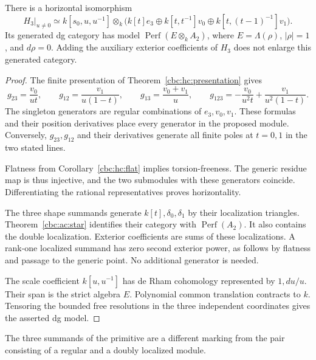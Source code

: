 \begin{proposition}\label{cbc:ac:primitive-chart}
There is a horizontal isomorphism
\[
 H_3|_{u\ne0}\simeq k[s_0,u,u^{-1}]\otimes_k
 \bigl(k[t]e_3\oplus k[t,t^{-1}]v_0
                   \oplus k[t,(t-1)^{-1}]v_1\bigr).
\]
Its generated dg category has model
$\operatorname{Perf}(E\otimes_k A_2)$, where
$E=\Lambda(\rho)$, $|\rho|=1$, and $d\rho=0$.
Adding the auxiliary exterior coefficients of $H_3$
does not enlarge this generated category.
\end{proposition}
\begin{proof}
The finite presentation of
Theorem~\ref{cbc:hc:presentation} gives
\[
 g_{23}=\frac{v_0}{ut},\qquad
 g_{12}=\frac{v_1}{u(1-t)},\qquad
 g_{13}=\frac{v_0+v_1}{u},\qquad
 g_{123}=-\frac{v_0}{u^2t}+\frac{v_1}{u^2(1-t)}.
\]
The singleton generators are regular combinations of
$e_3,v_0,v_1$. These formulas and their position
derivatives place every generator in the proposed
module. Conversely, $g_{23},g_{12}$ and their
derivatives generate all finite poles at $t=0,1$
in the two stated lines.

Flatness from
Corollary~\ref{cbc:hc:flat} implies torsion-freeness.
The generic residue map is thus injective, and the
two submodules with these generators coincide.
Differentiating the rational representatives proves
horizontality.

The three shape summands generate $k[t],\delta_0,\delta_1$
by their localization triangles. Theorem~\ref{cbc:ac:star}
identifies their category with $\operatorname{Perf}(A_2)$.
It also contains the double localization. Exterior
coefficients are sums of these localizations. A rank-one
localized summand has zero second exterior power,
as follows by flatness and passage to the generic point.
No additional generator is needed.

The scale coefficient $k[u,u^{-1}]$ has de Rham
cohomology represented by $1,du/u$. Their span is
the strict algebra $E$. Polynomial common translation
contracts to $k$. Tensoring the bounded free
resolutions in the three independent coordinates
gives the asserted dg model.
\end{proof}

The three summands of the primitive are a different
marking from the pair consisting of a regular and
a doubly localized module.

